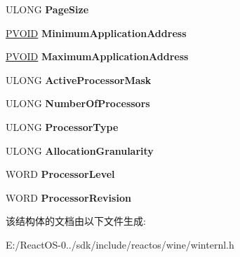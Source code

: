 \begin{DoxyCompactItemize}
\begin{tabbing}
\end{tabbing}\item 
\mbox{\label{struct___s_y_s_t_e_m___c_o_n_f_i_g_u_r_a_t_i_o_n___i_n_f_o_a5c9c0f44ec99b9fc592a549d8cb6b89b}} 
U\+L\+O\+NG {\bfseries Page\+Size}
\item 
\mbox{\label{struct___s_y_s_t_e_m___c_o_n_f_i_g_u_r_a_t_i_o_n___i_n_f_o_adfe22d76e6c78d0a2ca5b89d69df702e}} 
\hyperlink{interfacevoid}{P\+V\+O\+ID} {\bfseries Minimum\+Application\+Address}
\item 
\mbox{\label{struct___s_y_s_t_e_m___c_o_n_f_i_g_u_r_a_t_i_o_n___i_n_f_o_a42aa769d6f8f0c3cc184945ba534892b}} 
\hyperlink{interfacevoid}{P\+V\+O\+ID} {\bfseries Maximum\+Application\+Address}
\item 
\mbox{\label{struct___s_y_s_t_e_m___c_o_n_f_i_g_u_r_a_t_i_o_n___i_n_f_o_abe6df6ff110c96834201847a5557b86e}} 
U\+L\+O\+NG {\bfseries Active\+Processor\+Mask}
\item 
\mbox{\label{struct___s_y_s_t_e_m___c_o_n_f_i_g_u_r_a_t_i_o_n___i_n_f_o_adfd455e37f9a033b7583da6cec18b264}} 
U\+L\+O\+NG {\bfseries Number\+Of\+Processors}
\item 
\mbox{\label{struct___s_y_s_t_e_m___c_o_n_f_i_g_u_r_a_t_i_o_n___i_n_f_o_af90c6094785fdb1e1974ec06d01d354a}} 
U\+L\+O\+NG {\bfseries Processor\+Type}
\item 
\mbox{\label{struct___s_y_s_t_e_m___c_o_n_f_i_g_u_r_a_t_i_o_n___i_n_f_o_aa8535769fde32271f5faf7bf816b4259}} 
U\+L\+O\+NG {\bfseries Allocation\+Granularity}
\item 
\mbox{\label{struct___s_y_s_t_e_m___c_o_n_f_i_g_u_r_a_t_i_o_n___i_n_f_o_a85f5568e939172262a504d14fa2b5058}} 
W\+O\+RD {\bfseries Processor\+Level}
\item 
\mbox{\label{struct___s_y_s_t_e_m___c_o_n_f_i_g_u_r_a_t_i_o_n___i_n_f_o_a432b8eccb3ec5d070371117856e50228}} 
W\+O\+RD {\bfseries Processor\+Revision}
\end{DoxyCompactItemize}


该结构体的文档由以下文件生成\+:\begin{DoxyCompactItemize}
\item 
E\+:/\+React\+O\+S-\/0../sdk/include/reactos/wine/winternl.\+h\end{DoxyCompactItemize}
